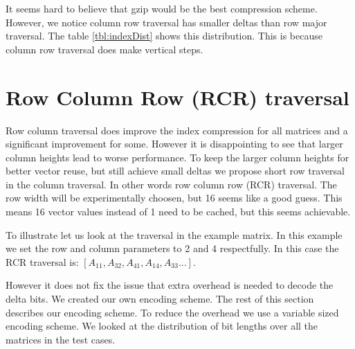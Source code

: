 \indent It seems hard to believe that gzip would be the best compression scheme. However, we notice column row traversal has smaller deltas than row major traversal. The table \ref{tbl:indexDist} shows this distribution. This is because column row traversal does make vertical steps.
\section{Row Column Row (RCR) traversal}
\par Row column traversal does improve the index compression for all matrices and a significant improvement for some. However it is disappointing to see that larger column heights lead to worse performance. To keep the larger column heights for better vector reuse, but still achieve small deltas we propose short row traversal in the column traversal. In other words row column row (RCR) traversal. The row width will be experimentally choosen, but 16 seems like a good guess. This means 16 vector values instead of 1 need to be cached, but this seems achievable.
\par To illustrate let us look at the traversal in the example matrix. In this example we set the row and column parameters to 2 and 4 respectfully. In this case the RCR traversal is: $[A_{11}, A_{32}, A_{41}, A_{14}, A_{33} \dots]$.

However it does not fix the issue that extra overhead is needed to decode the delta bits. We created our own encoding scheme. The rest of this section describes our encoding scheme. To reduce the overhead we use a variable sized encoding scheme. We looked at the distribution of bit lengths over all the matrices in the test cases. 





